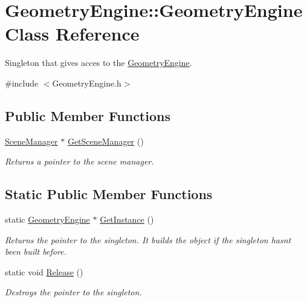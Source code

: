 \hypertarget{class_geometry_engine_1_1_geometry_engine}{}\section{Geometry\+Engine\+::Geometry\+Engine Class Reference}
\label{class_geometry_engine_1_1_geometry_engine}


Singleton that gives acces to the \mbox{\hyperlink{class_geometry_engine_1_1_geometry_engine}{Geometry\+Engine}}.  




{\ttfamily \#include $<$Geometry\+Engine.\+h$>$}

\subsection*{Public Member Functions}
\begin{DoxyCompactItemize}
\item 
\mbox{\label{class_geometry_engine_1_1_geometry_engine_a05ef74c582d54368b8df90b84a889f73}} 
\mbox{\hyperlink{class_geometry_engine_1_1_scene_manager}{Scene\+Manager}} $\ast$ \mbox{\hyperlink{class_geometry_engine_1_1_geometry_engine_a05ef74c582d54368b8df90b84a889f73}{Get\+Scene\+Manager}} ()
\begin{DoxyCompactList}\small\item\em Returns a pointer to the scene manager. \end{DoxyCompactList}\end{DoxyCompactItemize}
\subsection*{Static Public Member Functions}
\begin{DoxyCompactItemize}
\item 
\mbox{\label{class_geometry_engine_1_1_geometry_engine_ad3db079180166e79c3f37d8d487f2c29}} 
static \mbox{\hyperlink{class_geometry_engine_1_1_geometry_engine}{Geometry\+Engine}} $\ast$ \mbox{\hyperlink{class_geometry_engine_1_1_geometry_engine_ad3db079180166e79c3f37d8d487f2c29}{Get\+Instance}} ()
\begin{DoxyCompactList}\small\item\em Returns the pointer to the singleton. It builds the object if the singleton hasn\textquotesingle{}t been built before. \end{DoxyCompactList}\item 
\mbox{\label{class_geometry_engine_1_1_geometry_engine_a2c2e044075bfe61e6e18a07061072172}} 
static void \mbox{\hyperlink{class_geometry_engine_1_1_geometry_engine_a2c2e044075bfe61e6e18a07061072172}{Release}} ()
\begin{DoxyCompactList}\small\item\em Destroys the pointer to the singleton. \end{DoxyCompactList}\end{DoxyCompactItemize}
